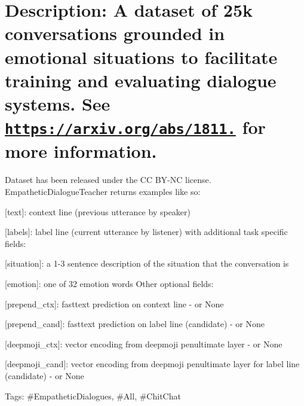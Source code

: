 \section*{Description\+: A dataset of 25k conversations grounded in emotional situations to facilitate training and evaluating dialogue systems. See \href{https://arxiv.org/abs/1811.00207}{\tt https\+://arxiv.\+org/abs/1811.} for more information. }

Dataset has been released under the CC B\+Y-\/\+NC license. Empathetic\+Dialogue\+Teacher returns examples like so\+:
\begin{DoxyItemize}
\item \mbox{[}text\mbox{]}\+: context line (previous utterance by \textquotesingle{}speaker\textquotesingle{})
\item \mbox{[}labels\mbox{]}\+: label line (current utterance by \textquotesingle{}listener\textquotesingle{}) with additional task specific fields\+:
\item \mbox{[}situation\mbox{]}\+: a 1-\/3 sentence description of the situation that the conversation is
\item \mbox{[}emotion\mbox{]}\+: one of 32 emotion words Other optional fields\+:
\item \mbox{[}prepend\+\_\+ctx\mbox{]}\+: fasttext prediction on context line -\/ or None
\item \mbox{[}prepend\+\_\+cand\mbox{]}\+: fasttext prediction on label line (candidate) -\/ or None
\item \mbox{[}deepmoji\+\_\+ctx\mbox{]}\+: vector encoding from deepmoji penultimate layer -\/ or None
\item \mbox{[}deepmoji\+\_\+cand\mbox{]}\+: vector encoding from deepmoji penultimate layer for label line (candidate) -\/ or None
\end{DoxyItemize}

Tags\+: \#\+Empathetic\+Dialogues, \#\+All, \#\+Chit\+Chat 